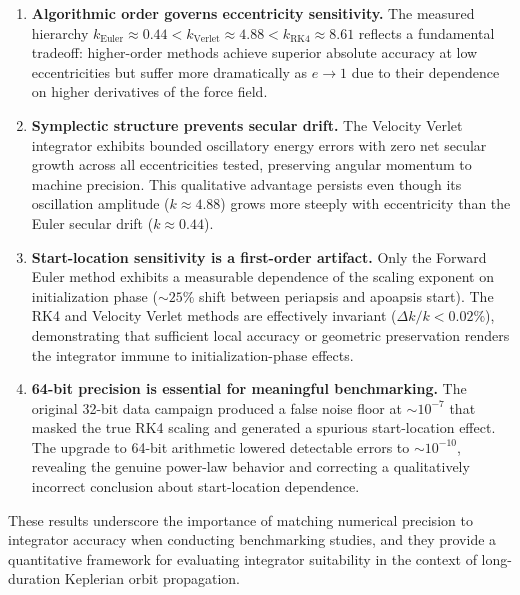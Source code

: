 \documentclass[twocolumn, 10pt]{article}
\begin{document}
\begin{enumerate}[nosep]
    \item \textbf{Algorithmic order governs eccentricity sensitivity.} The measured hierarchy $k_{\text{Euler}} \approx 0.44 < k_{\text{Verlet}} \approx 4.88 < k_{\text{RK4}} \approx 8.61$ reflects a fundamental tradeoff: higher-order methods achieve superior absolute accuracy at low eccentricities but suffer more dramatically as $e \to 1$ due to their dependence on higher derivatives of the force field.

    \item \textbf{Symplectic structure prevents secular drift.} The Velocity Verlet integrator exhibits bounded oscillatory energy errors with zero net secular growth across all eccentricities tested, preserving angular momentum to machine precision. This qualitative advantage persists even though its oscillation amplitude ($k \approx 4.88$) grows more steeply with eccentricity than the Euler secular drift ($k \approx 0.44$).

    \item \textbf{Start-location sensitivity is a first-order artifact.} Only the Forward Euler method exhibits a measurable dependence of the scaling exponent on initialization phase (${\sim}25\%$ shift between periapsis and apoapsis start). The RK4 and Velocity Verlet methods are effectively invariant ($\Delta k / k < 0.02\%$), demonstrating that sufficient local accuracy or geometric preservation renders the integrator immune to initialization-phase effects.

    \item \textbf{64-bit precision is essential for meaningful benchmarking.} The original 32-bit data campaign produced a false noise floor at $\sim 10^{-7}$ that masked the true RK4 scaling and generated a spurious start-location effect. The upgrade to 64-bit arithmetic lowered detectable errors to $\sim 10^{-10}$, revealing the genuine power-law behavior and correcting a qualitatively incorrect conclusion about start-location dependence.
\end{enumerate}

These results underscore the importance of matching numerical precision to integrator accuracy when conducting benchmarking studies, and they provide a quantitative framework for evaluating integrator suitability in the context of long-duration Keplerian orbit propagation.
\end{document}
